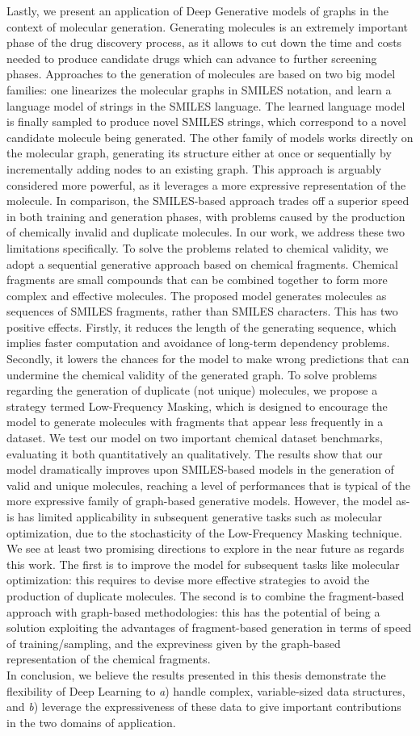 Lastly, we present an application of Deep Generative models of graphs in the context of molecular generation. Generating molecules is an extremely important phase of the drug discovery process, as it allows to cut down the time and costs needed to produce candidate drugs which can advance to further screening phases. Approaches to the generation of molecules are based on two big model families: one linearizes the molecular graphs in SMILES notation, and learn a language model of strings in the SMILES language. The learned language model is finally sampled to produce novel SMILES strings, which correspond to a novel candidate molecule being generated. The other family of models works directly on the molecular graph, generating its structure either at once or sequentially by incrementally adding nodes to an existing graph. This approach is arguably considered more powerful, as it leverages a more expressive representation of the molecule. In comparison, the SMILES-based approach trades off a superior speed in both training and generation phases, with problems caused by the production of chemically invalid and duplicate molecules. In our work, we address these two limitations specifically. To solve the problems related to chemical validity, we adopt a sequential generative approach based on chemical fragments. Chemical fragments are small compounds that can be combined together to form more complex and effective molecules. The proposed model generates molecules as sequences of SMILES fragments, rather than SMILES characters. This has two positive effects. Firstly, it reduces the length of the generating sequence, which implies faster computation and avoidance of long-term dependency problems. Secondly, it lowers the chances for the model to make wrong predictions that can undermine the chemical validity of the generated graph. To solve problems regarding the generation of duplicate (not unique) molecules, we propose a strategy termed Low-Frequency Masking, which is designed to encourage the model to generate molecules with fragments that appear less frequently in a dataset. We test our model on two important chemical dataset benchmarks, evaluating it both quantitatively an qualitatively. The results show that our model dramatically improves upon SMILES-based models in the generation of valid and unique molecules, reaching a level of performances that is typical of the more expressive family of graph-based generative models. However, the model as-is has limited applicability in subsequent generative tasks such as molecular optimization, due to the stochasticity of the Low-Frequency Masking technique. We see at least two promising directions to explore in the near future as regards this work. The first is to improve the model for subsequent tasks like molecular optimization: this requires to devise more effective strategies to avoid the production of duplicate molecules. The second is to combine the fragment-based approach with graph-based methodologies: this has the potential of being a  solution exploiting the advantages of fragment-based generation in terms of speed of training/sampling, and the expreviness given by the graph-based representation of the chemical fragments.
\\
In conclusion, we believe the results presented in this thesis demonstrate the flexibility of Deep Learning to \emph{a}) handle complex, variable-sized data structures, and \emph{b}) leverage the expressiveness of these data to give important contributions in the two domains of application.
